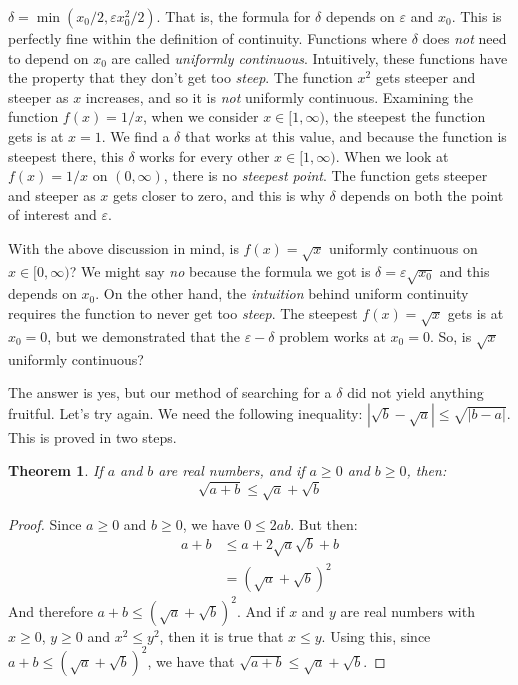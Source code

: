 \documentclass{article}
\theoremstyle{normal}
\theoremstyle{plain}
\newtheorem{theorem}{Theorem}
\begin{document}
    $\delta=\min(x_{0}/2,\varepsilon{x}_{0}^{2}/2)$. That is, the formula
    for $\delta$ depends on $\varepsilon$ and $x_{0}$. This is perfectly fine
    within the definition of continuity. Functions where $\delta$ does
    \textit{not} need to depend on $x_{0}$ are called
    \textit{uniformly continuous}. Intuitively, these functions have the
    property that they don't get too \textit{steep}. The function
    $x^{2}$ gets steeper and steeper as $x$ increases, and so it is
    \textit{not} uniformly continuous. Examining the function $f(x)=1/x$,
    when we consider $x\in[1,\infty)$, the steepest the function gets is at
    $x=1$. We find a $\delta$ that works at this value, and because the
    function is steepest there, this $\delta$ works for every other
    $x\in[1,\infty)$. When we look at $f(x)=1/x$ on $(0,\infty)$, there is no
    \textit{steepest point}. The function gets steeper and steeper as $x$ gets
    closer to zero, and this is why $\delta$ depends on both the point of
    interest and $\varepsilon$.
    \par\hfill\par
    With the above discussion in mind, is $f(x)=\sqrt{x}$ uniformly continuous
    on $x\in[0,\infty)$? We might say \textit{no} because the formula we got
    is $\delta=\varepsilon\sqrt{x_{0}}$ and this depends on $x_{0}$. On the
    other hand, the \textit{intuition} behind uniform continuity requires the
    function to never get too \textit{steep}. The steepest $f(x)=\sqrt{x}$
    gets is at $x_{0}=0$, but we demonstrated that the $\varepsilon-\delta$
    problem works at $x_{0}=0$. So, is $\sqrt{x}$ uniformly continuous?
    \par\hfill\par
    The answer is yes, but our method of searching for a $\delta$ did not
    yield anything fruitful. Let's try again. We need the following
    inequality: $|\sqrt{b}-\sqrt{a}|\leq\sqrt{|b-a|}$. This is proved in two
    steps.
    \begin{theorem}
        If $a$ and $b$ are real numbers, and if $a\geq{0}$ and $b\geq{0}$,
        then:
        \begin{equation}
            \sqrt{a+b}\leq\sqrt{a}+\sqrt{b}
        \end{equation}
    \end{theorem}
    \begin{proof}
        Since $a\geq{0}$ and $b\geq{0}$, we have $0\leq2ab$. But then:
        \begin{align}
            a+b&\leq{a}+2\sqrt{a}\sqrt{b}+b\\
            &=(\sqrt{a}+\sqrt{b})^{2}
        \end{align}
        And therefore $a+b\leq(\sqrt{a}+\sqrt{b})^{2}$. And if
        $x$ and $y$ are real numbers with $x\geq{0}$, $y\geq{0}$ and
        $x^{2}\leq{y}^{2}$, then it is true that $x\leq{y}$. Using this, since
        $a+b\leq(\sqrt{a}+\sqrt{b})^{2}$, we have that
        $\sqrt{a+b}\leq\sqrt{a}+\sqrt{b}$.
    \end{proof}
\end{document}
